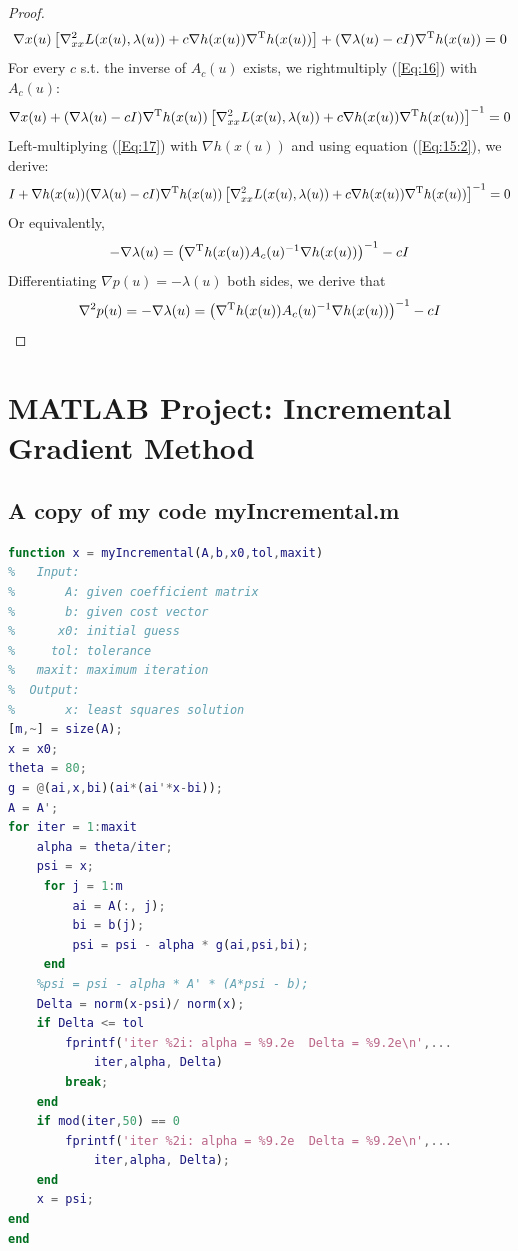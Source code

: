 \begin{enumerate}
\begin{proof}
\begin{equation}
\nabla x(u)\left[
\nabla^2_{xx}L(x(u),\lambda(u))+c\nabla h(x(u))\nabla^{\mathrm T} h(x(u))
\right]
+
(\nabla\lambda(u)-cI)\nabla^{\mathrm T} h(x(u))=0
\end{equation}
For every $c$ s.t. the inverse of $A_c(u)$ exists, we rightmultiply (\ref{Eq:16}) with $A_c(u)$:
\begin{equation}\label{Eq:17}
\nabla x(u)+(\nabla\lambda(u)-cI)\nabla^{\mathrm T} h(x(u))
\left[\nabla^2_{xx}L(x(u),\lambda(u))+c\nabla h(x(u))\nabla^{\mathrm T} h(x(u))\right]^{-1}=0
\end{equation}
Left-multiplying (\ref{Eq:17}) with $\nabla h(x(u))$ and using equation (\ref{Eq:15:2}), we derive:
\[
I+\nabla h(x(u))(\nabla\lambda(u)-cI)\nabla^{\mathrm T} h(x(u))
\left[\nabla^2_{xx}L(x(u),\lambda(u))+c\nabla h(x(u))\nabla^{\mathrm T} h(x(u))\right]^{-1}=0
\]
Or equivalently,
\[
-\nabla \lambda(u)=\left(\nabla^{\mathrm T} h(x(u))A_c(u)^{-1}\nabla h(x(u))\right)^{-1}-cI
\]
Differentiating $\nabla p(u)=-\lambda(u)$ both sides, we derive that
\[
\nabla^2 p(u)=-\nabla \lambda(u)=\left(\nabla^{\mathrm T} h(x(u))A_c(u)^{-1}\nabla h(x(u))\right)^{-1}-cI
\]

\end{proof}









\end{enumerate}
\clearpage
\section*{MATLAB Project: Incremental Gradient Method}
\subsection*{A copy of my code myIncremental.m}

\begin{lstlisting}[language=matlab]
function x = myIncremental(A,b,x0,tol,maxit)
%   Input:
%       A: given coefficient matrix
%       b: given cost vector
%      x0: initial guess
%     tol: tolerance
%   maxit: maximum iteration
%  Output:
%       x: least squares solution
[m,~] = size(A);
x = x0;
theta = 80;
g = @(ai,x,bi)(ai*(ai'*x-bi));
A = A';
for iter = 1:maxit
    alpha = theta/iter;
    psi = x;
     for j = 1:m
         ai = A(:, j);
         bi = b(j);
         psi = psi - alpha * g(ai,psi,bi);
     end
    %psi = psi - alpha * A' * (A*psi - b);
    Delta = norm(x-psi)/ norm(x);
    if Delta <= tol 
        fprintf('iter %2i: alpha = %9.2e  Delta = %9.2e\n',...
            iter,alpha, Delta)
        break;
    end
    if mod(iter,50) == 0
        fprintf('iter %2i: alpha = %9.2e  Delta = %9.2e\n',...
            iter,alpha, Delta);
    end
    x = psi;
end
end
\end{lstlisting}

